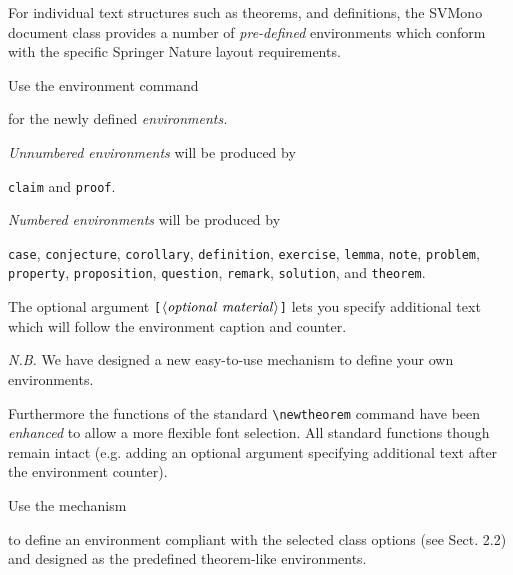 \documentclass[graybox,square]{svmono}
\begin{document}
\begin{sloppy}
For individual text structures such as theorems, and definitions, the {\sc SVMono} document class provides a number of {\it pre-defined} environments which conform with the specific Springer Nature layout requirements.

Use the environment command

\cprotect{}

for the newly defined {\it environments.}

{\it Unnumbered environments} will be produced by

\verb|claim| and \verb|proof|.

{\it Numbered environments} will be produced by

{\tt case}, {\tt conjecture}, {\tt corollary}, {\tt definition}, {\tt exercise}, {\tt lemma}, {\tt note}, {\tt problem}, {\tt property}, {\tt proposition}, {\tt question}, {\tt remark}, {\tt solution}, and {\tt theorem}.

The optional argument \verb|[|$\langle {\it optional~material}\rangle$\verb|]| lets you specify additional text which will follow the environment caption and counter.

{\it N.B.} We have designed a new easy-to-use mechanism to define your own environments.

Furthermore the functions of the standard \verb|\newtheorem| command have been {\it enhanced} to allow a more flexible font selection. All standard functions though remain intact (e.g. adding an optional argument specifying additional text after the environment counter).

Use the mechanism

\cprotect{}

to define an environment compliant with the selected class options (see Sect. 2.2) and designed as the predefined theorem-like environments.


\end{sloppy}
\end{document}
